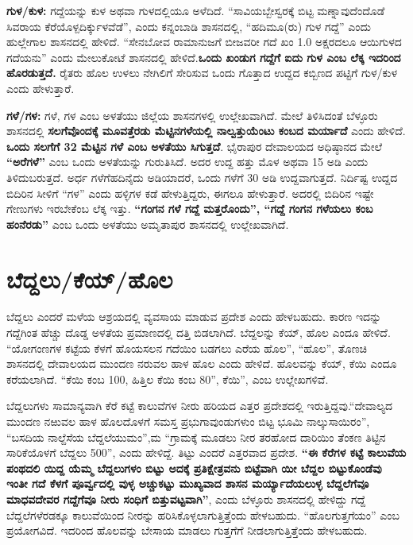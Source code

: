 \textbf{ಗುಳ/ಕುಳ:} ಗದ್ದೆಯನ್ನು ಕುಳ ಅಥವಾ ಗುಳದಲ್ಲಿಯೂ ಅಳೆದಿದೆ. “ಸಾವಿಯಬ್ಬೇಸ್ವರಕ್ಕೆ ಬಿಟ್ಟ ಮಣ್ನಾವುದೆಂದೊಡೆ ಸಿವರಾಯ ಕೆರೆಯೊಳ್ಪದಿರ್ಕ್ಕುಳವೆಡೆ”, ಎಂದು ಕನ್ನಂಬಾಡಿ ಶಾಸನದಲ್ಲಿ, “ಹದಿಮೂ(ರು) ಗುಳ ಗದ್ದೆ” ಎಂದು ಹುಲ್ಲೇಗಾಲ ಶಾಸನದಲ್ಲಿ ಹೇಳಿದೆ. “ಸೇನಬೋವ ರಾಮಾನುಜಗೆ ಬೀಜವರೀ ಗದೆ ಖಂ 1.0 ಅಕ್ಷರದಲೂ ಆಯಿಗುಳದ ಗದೆಯನು” ಎಂದು ಮೇಲುಕೋಟೆ ಶಾಸನದಲ್ಲಿ ಹೇಳಿದೆ.\textbf{ಒಂದು ಖಂಡುಗ ಗದ್ದೆಗೆ ಐದು ಗುಳ ಎಂಬ ಲೆಕ್ಕ ಇದರಿಂದ ಹೊರಡುತ್ತದೆ.} ರೈತರು ಹೊಲ ಉಳಲು ನೇಗಿಲಿಗೆ ಸೇರಿಸುವ ಒಂದು ಗೊತ್ತಾದ ಉದ್ದದ ಕಬ್ಬಿಣದ ಪಟ್ಟಿಗೆ ಗುಳ/ಕುಳ ಎಂದು ಹೇಳುತ್ತಾರೆ.

\textbf{ಗಳೆ/ಗಳ:} ಗಳೆ, ಗಳ ಎಂಬ ಅಳತೆಯು ಜಿಲ್ಲೆಯ ಶಾಸನಗಳಲ್ಲಿ ಉಲ್ಲೇಖವಾಗಿದೆ. ಮೇಲೆ ತಿಳಿಸಿದಂತೆ ಬೆಳ್ಳೂರು ಶಾಸನದಲ್ಲಿ \textbf{ಸಲಗೆವೊಂದಕ್ಕೆ ಮೂವತ್ತೆರಡು ಮೆಟ್ಟಿನಗಳೆಯಲ್ಲಿ ನಾಲ್ವತ್ತುಯೆಂಟು ಕಂಬದ ಮರ್ಯಾದೆ} ಎಂದು ಹೇಳಿದೆ. \textbf{ಒಂದು ಸಲಗೆಗೆ 32 ಮೆಟ್ಟಿನ ಗಳೆ ಎಂಬ ಅಳತೆಯು ಸಿಗುತ್ತದೆ}. ಭೈರಾಪುರ ದೇವಾಲಯದ ಅಧಿಷ್ಠಾನದ ಮೇಲೆ \textbf{“ಅರೆಗಳೆ”} ಎಂಬ ಒಂದು ಅಳತೆಯನ್ನು ಗುರುತಿಸಿದೆ. ಅದರ ಉದ್ದ ಹತ್ತು ಮೊಳ ಅಥವಾ 15 ಅಡಿ ಎಂದು ತಿಳಿದುಬರುತ್ತದೆ. ಅರ್ಧ ಗಳೆಗೆ\break ಹದಿನೈದು ಅಡಿಯಾದರೆ, ಒಂದು ಗಳೆಗೆ 30 ಅಡಿ ಉದ್ದವಾಗುತ್ತದೆ. ನಿರ್ದಿಷ್ಟ ಉದ್ದದ ಬಿದಿರಿನ ಸೀಳಿಗೆ “ಗಳ” ಎಂದು ಹಳ್ಳಿಗಳ ಕಡೆ ಹೇಳುತ್ತಿದ್ದರು, ಈಗಲೂ ಹೇಳುತ್ತಾರೆ. ಅದರಲ್ಲಿ ಬಿದಿರಿನ ಇಷ್ಟೇ ಗೇಣುಗಳು ಇರಬೇಕೆಂಬ ಲೆಕ್ಕ ಇತ್ತು. \textbf{“ಗಂಗನ ಗಳೆ ಗದ್ದೆ ಮತ್ತರೊಂದು”, “ಗದ್ದೆ ಗಂಗನ ಗಳೆಯಲು ಕಂಬ ಹಂನೆರಡು”} ಎಂಬ ಒಂದು ಅಳತೆಯು ಅಮೃತಾಪುರ ಶಾಸನದಲ್ಲಿ ಉಲ್ಲೇಖವಾಗಿದೆ.


\section{ಬೆದ್ದಲು/ಕೆಯ್​/ಹೊಲ}

ಬೆದ್ದಲು ಎಂದರೆ ಮಳೆಯ ಆಶ್ರಯದಲ್ಲಿ ವ್ಯವಸಾಯ ಮಾಡುವ ಪ್ರದೇಶ ಎಂದು ಹೇಳಬಹುದು. ಕಾರಣ ಇದನ್ನು ಗದ್ದೆಗಿಂತ ಹೆಚ್ಚು ದೊಡ್ಡ ಅಳತೆಯ ಪ್ರಮಾಣದಲ್ಲಿ ದತ್ತಿ ಬಿಡಲಾಗಿದೆ. ಬೆದ್ದಲನ್ನು ಕೆಯ್​, ಹೊಲ ಎಂದೂ ಹೇಳಿದೆ. “ಯೋಗಂಣಗಳ ಕಟ್ಟೆಯ ಕೆಳಗೆ ಹೊಯಸಲನ ಗದೆಯಿಂ ಬಡಗಲು ಎರೆಯ ಹೊಲ”, “ಹೊಲ”, ತೊಣಚಿ ಶಾಸನದಲ್ಲಿ ದೇವಾಲಯದ ಮುಂದಣ ನರುವಲ ಹಾಳ ಹೊಲ ಎಂದು ಹೇಳಿದೆ. ಹೊಲವನ್ನು ಕೆಯ್​, ಕೆಯಿ ಎಂದೂ ಕರೆಯಲಾಗಿದೆ. “ಕೆಯಿ ಕಂಬ 100, ಹಿತ್ತಿಲ ಕೆಯಿ ಕಂಬ 80”, ಕೆಯಿ”, ಎಂಬ ಉಲ್ಲೇಖಗಳಿವೆ.

ಬೆದ್ದಲುಗಳು ಸಾಮಾನ್ಯವಾಗಿ ಕೆರೆ ಕಟ್ಟೆ ಕಾಲುವೆಗಳ ನೀರು ಹರಿಯದ ಎತ್ತರ ಪ್ರದೇಶದಲ್ಲಿ ಇರುತ್ತಿದ್ದವು.\break “ದೇವಾಲ್ಯದ ಮುಂದಣ ನಱುವಲ ಹಾಳ ಹೊಲದೊಳಗೆ ಸಮಸ್ತ ಪ್ರಭುಗಾವುಂಡುಗಳುಂ ಬಿಟ್ಟ ಭೂಮಿ ನಾಲ್ಕುಸಾಯಿರಂ”, “ಬಸದಿಯ ನಾಲ್ದೆಸೆಯ ಬೆದ್ದಲೆಯುಮಂ”,ಮ “ಗ್ರಾಮಕ್ಕೆ ಮೂಡಲು ನೀರ ತರಹೋದ ದಾರಿಯಿಂ ತೆಂಕಣ ತಿಟ್ಟಿನ ಸಾರಿಕೆಯೊಳಗೆ ಬೆದ್ದಲು 500”, ಎಂದು ಹೇಳಿದ್ದೆ. ತಿಟ್ಟು ಎಂದರೆ ಎತ್ತರವಾದ ಪ್ರದೇಶ. \textbf{“ಈ ಕೆರೆಗಳ ಕಟ್ಟೆ ಕಾಲುವೆಯ ಪಂಥದಲಿ ಯಿದ್ದ ಯೆಮ್ಮ ಬೆದ್ದಲುಗಳಂ ಬಿಟ್ಟು ಅದಕ್ಕೆ ಪ್ರತಿಕ್ಷೇತ್ರವನು ಬಿಟ್ಟೆವಾಗಿ ಯೀ ಬೆದ್ದಲ ಬಿಟ್ಟುಕೊಂಡೆವು ಇಂತೀ ಗದೆ ಕೆಳಗೆ ಪೂರ್ವ್ವದಲ್ಲಿ ವುಳ್ಳ ಅಚ್ಚುಕಟ್ಟು ಮುಖ್ಯವಾದ ಶಾಸನ ಮರ್ಯ್ಯಾದೆಯಲುಳ್ಳ ಬೆದ್ದಲೆಗೆವೂ ಮಾಧವದೇವರ ಗದ್ದೆಗೆವೂ ನೀರು ಸಂಧಿಗೆ ಬಿತ್ತುವಟ್ಟವಾಗಿ”}, ಎಂದು ಬೆಳ್ಳೂರು ಶಾಸನದಲ್ಲಿ ಹೇಳಿದ್ದು ಗದ್ದೆ ಬೆದ್ದಲೆಗಳೆರಡಕ್ಕೂ ಕಾಲುವೆಯಿಂದ ನೀರನ್ನು ಹರಿಸಿಕೊಳ್ಳಲಾಗುತ್ತಿತ್ತೆಂದು ಹೇಳಬಹುದು. “ಹೊಲಗುತ್ತಗೆಯಂ” ಎಂಬ ಪ್ರಯೋಗವಿದೆ. ಇದರಿಂದ ಹೊಲವನ್ನು ಬೇಸಾಯ ಮಾಡಲು ಗುತ್ತಗೆಗೆ ನೀಡಲಾಗುತ್ತಿತ್ತೆಂದು ಹೇಳಬಹುದು.



